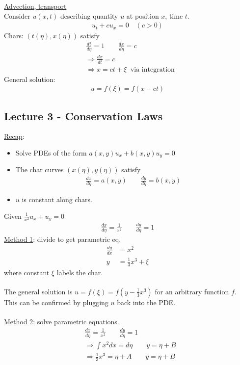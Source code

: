 \documentclass[12pt, letterpaper]{article}
\begin{document}
\underline{Advection, transport}\\
Consider $u(x,t)$ describing quantity $u$ at position $x$, time $t$.
\begin{align*}
    u_t + cu_x = 0 \quad (c>0)
\end{align*}
Chars: $(t(\eta), x(\eta))$ satisfy 
\begin{align*}
    &\frac{dt}{d\eta} = 1 \qquad \frac{dx}{d\eta} = c \\
    &\Rightarrow \frac{dx}{dt} = c  \\ &\Rightarrow x = ct + \xi\ \text{ via integration}
\end{align*}
General solution:
\begin{align*}
    u = f(\xi) = f(x-ct)
\end{align*}
\subsection{Lecture 3 - Conservation Laws}
\underline{Recap}:
\begin{itemize}
    \item Solve PDEs of the form $a(x,y)u_x + b(x,y)u_y = 0$
    \item The char curves $(x(\eta),y(\eta))$ satisfy \begin{align*}
        \frac{dx}{d\eta} = a(x,y) \qquad \frac{dy}{d\eta} = b(x,y)
    \end{align*}
    \item $u$ is constant along chars.
\end{itemize}
 Given $\frac{1}{x^2} u_x + u_y = 0$
\begin{align*}
    \frac{dx}{d\eta} = \frac{1}{x^2} \qquad \frac{dy}{d\eta} = 1 
\end{align*} 
\underline{Method 1}: divide to get parametric eq.
\begin{align*}
    \frac{dy}{dx} &= x^2 \\
    y &= \frac 13 x^3 + \xi
\end{align*}
where constant $\xi$ labels the char. \\ \\
The general solution is $u = f(\xi) = f(y-\frac 13 x^3)$ for an arbitrary function $f$. This 
can be confirmed by plugging $u$ back into the PDE. \\ \\
\underline{Method 2}: solve parametric equations.
\begin{align*}
    &\frac{dx}{d\eta} = \frac{1}{x^2} \qquad \frac{dy}{d\eta} = 1 \\
    &\Rightarrow \int x^2 dx = d\eta \qquad y = \eta + B \\
    &\Rightarrow \frac{1}{3} x^3 = \eta + A \qquad y = \eta + B
\end{align*}
\end{document}
